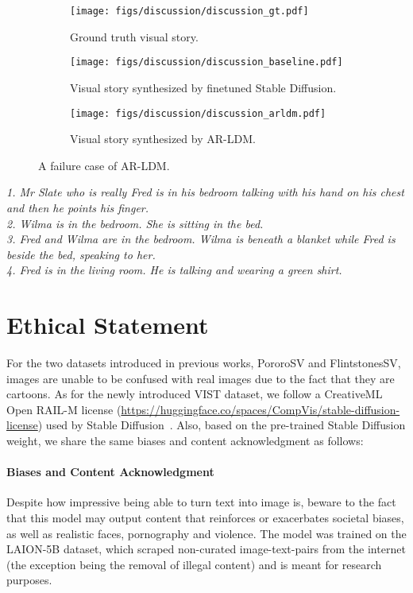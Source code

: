 \documentclass[10pt,twocolumn,letterpaper]{article}
\begin{document}
\begin{figure}[!ht]
\centering
\begin{subfigure}{\linewidth}
\texttt{[image: figs/discussion/discussion\_gt.pdf]}
\caption{Ground truth visual story.}
\label{fig:dicussion_gt}
\end{subfigure}
\begin{subfigure}{\linewidth}
\texttt{[image: figs/discussion/discussion\_baseline.pdf]}
\caption{Visual story synthesized by finetuned Stable Diffusion.}
\label{fig:dicussion_baseline}
\end{subfigure}
\begin{subfigure}{\linewidth}
\texttt{[image: figs/discussion/discussion\_arldm.pdf]}
\caption{Visual story synthesized by AR-LDM.}
\label{fig:dicussion_arldm}
\end{subfigure}
\caption{A failure case of AR-LDM.}
\label{fig:dicussion}
\end{figure}

\setlength\parindent{0pt}
\footnotesize{\textit{
1. Mr Slate who is really Fred is in his bedroom talking with his hand on his chest and then he points his finger.\\
2. Wilma is in the bedroom. She is sitting in the bed.\\
3. Fred and Wilma are in the bedroom. Wilma is beneath a blanket while Fred is beside the bed, speaking to her.\\
4. Fred is in the living room. He is talking and wearing a green shirt.
}}
\setlength\parindent{1pc}

\newpage
\section{Ethical Statement}
For the two datasets introduced in previous works, PororoSV and FlintstonesSV, images are unable to be confused with real images due to the fact that they are cartoons. As for the newly introduced VIST dataset, we follow a CreativeML Open RAIL-M license (\url{https://huggingface.co/spaces/CompVis/stable-diffusion-license}) used by Stable Diffusion~\cite{ldm}. Also, based on the pre-trained Stable Diffusion weight, we share the same biases and content acknowledgment as follows:

\paragraph{Biases and Content Acknowledgment}
Despite how impressive being able to turn text into image is, beware to the fact that this model may output content that reinforces or exacerbates societal biases, as well as realistic faces, pornography and violence. The model was trained on the LAION-5B dataset, which scraped non-curated image-text-pairs from the internet (the exception being the removal of illegal content) and is meant for research purposes.
\end{document}
